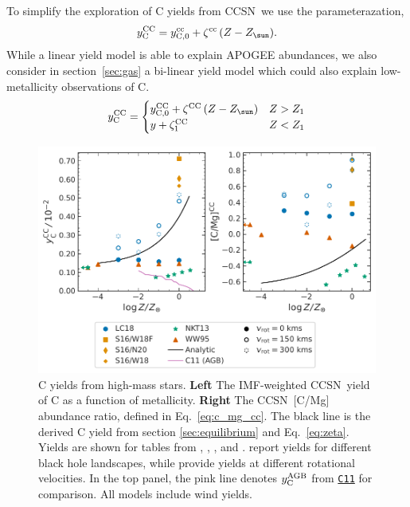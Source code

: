 \documentclass[fleqn,
usenatbib]{mnras}
\newcommand{\cxi}{\texttt{\hyperlink{C11}{C11}}}
\newcommand{\cc}{CCSN}
\newcommand{\Ycc}{\ensuremath{y_{\rm C}^{\rm CC}}}
\newcommand{\Ycagb}{\ensuremath{y_{\rm C}^{\rm AGB}}}
\newcommand{\Zo}{%
    \ifmmode Z_{\sun}%
    \else $Z_{\sun}$%
    \fi}
\begin{document}
To simplify the exploration of C yields from \cc\, we use the parameterazation, 
\begin{equation}\label{eq:y_cc}
    \Ycc = y_{\rm C, 0}^{\rm cc} + \zeta^{\rm cc}\,(Z-\Zo) .
\end{equation}
While a linear yield model is able to explain APOGEE abundances, we also consider in section~\ref{sec:gas} a bi-linear yield model which could also explain low-metallicity observations of C.
\begin{equation}\label{eq:y_cc_bilinear}
    \Ycc = \begin{cases}
    y_{\rm C, 0}^{\rm CC} + \zeta^{\rm CC}\,(Z-\Zo) & Z > Z_1 \\
    y + \zeta_1^{\rm CC} & Z < Z_1
    \end{cases}
\end{equation}


\begin{figure}
    \centering
    \includegraphics{cc_yields.pdf}
    \caption[]{
        C yields from high-mass stars.
        \textbf{Left} The IMF-weighted \cc\ yield of C as a function of metallicity.
        \textbf{Right} The \cc\ [C/Mg] abundance ratio, defined in Eq.~\ref{eq:c_mg_cc}. The black line is the derived C yield from section \ref{sec:equilibrium} and Eq.~\ref{eq:zeta}. Yields are shown for tables from 
    \citet[red triangles]{WW95}, \citet[orange squares and diamonds]{sukhbold+16}, 
    \citet[green stars]{NKT13}, and \citet[blue circles]{LC18}. \citet{sukhbold+16} report yields for different black hole landscapes, while \citet{LC18} provide yields at different rotational velocities.
    In the top panel, the pink line denotes $\Ycagb$ from \cxi{} for comparison. All models include wind yields. 
}
    \label{fig:y_cc}
\end{figure}
\end{document}
